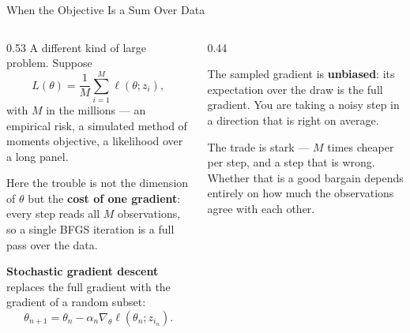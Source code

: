 \begin{frame}{When the Objective Is a Sum Over Data}
\begin{columns}[T]
\begin{column}{0.53\textwidth}
\small
A different kind of large problem. Suppose
\[
  L(\theta)=\frac1M\sum_{i=1}^{M}\ell(\theta;z_i),
\]
with $M$ in the millions --- an empirical risk, a simulated method of moments objective, a likelihood over a long panel.
\medskip

Here the trouble is not the dimension of $\theta$ but the \textbf{cost of one gradient}: every step reads all $M$ observations, so a single BFGS iteration is a full pass over the data.
\medskip

\textbf{Stochastic gradient descent} replaces the full gradient with the gradient of a random subset:
\[
  \theta_{n+1}=\theta_n-\alpha_n\nabla_\theta\ell(\theta_n;z_{i_n}).
\]
\end{column}
\begin{column}{0.44\textwidth}
\begin{conceptbox}[title=\textbf{Why it is not madness}]\small
The sampled gradient is \textbf{unbiased}: its expectation over the draw is the full gradient. You are taking a noisy step in a direction that is right on average.
\end{conceptbox}
\medskip
\begin{examplebox}\footnotesize
The trade is stark --- $M$ times cheaper per step, and a step that is wrong. Whether that is a good bargain depends entirely on how much the observations agree with each other.
\end{examplebox}
\end{column}
\end{columns}
\vspace{1mm}
\end{frame}

